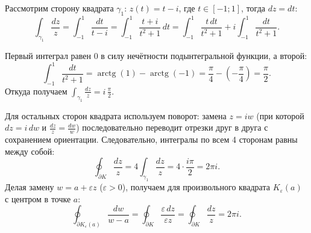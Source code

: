 \begin{example} \label{11:int_square}
\hfill \noindent
\par
\begin{minipage}[c]{0.36\textwidth}
\centering
{}
\end{minipage}%
\hfill
\begin{minipage}[c]{0.61\textwidth}
\small
Рассмотрим сторону квадрата $\gamma_1$: $z(t) = t - i$, где $t \in [-1; 1]$, тогда $dz = dt$:
\[
\int_{\gamma_1} \frac{dz}{z} = \int_{-1}^{1} \frac{dt}{t - i} = \int_{-1}^{1} \frac{t + i}{t^2 + 1}
\,dt = \int_{-1}^{1} \frac{t\,dt}{t^2 + 1} + i \int_{-1}^{1} \frac{dt}{t^2 + 1}.
\]

Первый интеграл равен $0$ в силу нечётности подынтегральной функции, а второй:
\[
\int_{-1}^{1} \frac{dt}{t^2 + 1} = \operatorname{arctg}(1) - \operatorname{arctg}(-1) =
\frac{\pi}{4} - \left(-\frac{\pi}{4}\right) = \frac{\pi}{2}.
\]
Откуда получаем $\displaystyle\int_{\gamma_1} \frac{dz}{z} = i\,\frac{\pi}{2}$.
\end{minipage}

\medskip\noindent
Для остальных сторон квадрата используем поворот: замена $z = iw$ (при которой $dz = i\,dw$ и
$\frac{dz}{z} = \frac{dw}{w}$) последовательно переводит отрезки друг в друга с сохранением
ориентации. Следовательно, интегралы по всем 4 сторонам равны между собой:
\[
\oint_{\partial K} \frac{dz}{z} = 4 \int_{\gamma_1} \frac{dz}{z} = 4 \cdot \frac{i\pi}{2} = 2\pi i.
\]
Делая замену $w = a + \varepsilon z$ ($\varepsilon > 0$), получаем для произвольного квадрата
$K_\varepsilon(a)$ с центром в точке $a$:
\[
\oint_{\partial K_\varepsilon(a)} \frac{dw}{w - a} = \oint_{\partial K}
\frac{\varepsilon\,dz}{\varepsilon z} = \oint_{\partial K} \frac{dz}{z} = 2\pi i.
\]
\end{example}


